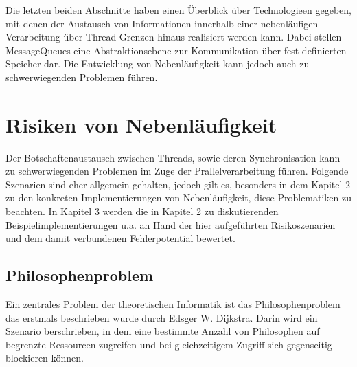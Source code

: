 \documentclass[12pt,oneside,a4paper,bibtotoc,liststotoc]{scrreprt}
\begin{document}
Die letzten beiden Abschnitte haben einen Überblick über Technologieen gegeben, mit denen der Austausch von Informationen innerhalb einer nebenläufigen Verarbeitung über Thread Grenzen hinaus realisiert werden kann. Dabei stellen MessageQueues eine Abstraktionsebene zur Kommunikation über fest definierten Speicher dar. Die Entwicklung von Nebenläufigkeit kann jedoch auch zu schwerwiegenden Problemen führen.


\section{Risiken von Nebenläufigkeit}
Der Botschaftenaustausch zwischen Threads, sowie deren Synchronisation kann zu schwerwiegenden Problemen im Zuge der Prallelverarbeitung führen. Folgende Szenarien sind eher allgemein gehalten, jedoch gilt es, besonders in dem Kapitel 2  zu den konkreten Implementierungen von Nebenläufigkeit, diese Problematiken zu beachten. In Kapitel 3 werden die in Kapitel 2 zu diskutierenden Beispielimplementierungen u.a. an Hand der hier aufgeführten Risikoszenarien und dem damit verbundenen Fehlerpotential bewertet.

\subsection{Philosophenproblem}
Ein zentrales Problem der theoretischen Informatik ist das Philosophenproblem das erstmals beschrieben wurde durch Edsger W. Dijkstra. Darin wird ein Szenario berschrieben, in dem eine bestimmte Anzahl von Philosophen auf begrenzte Ressourcen zugreifen und bei gleichzeitigem Zugriff sich gegenseitig blockieren können.
\end{document}
